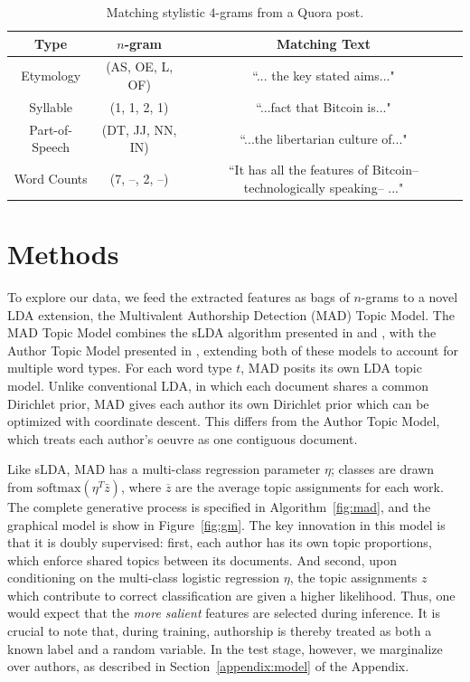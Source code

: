 \documentclass[14pt]{article} %
\theoremstyle{plain}
\theoremstyle{definition}
\theoremstyle{remark}
\begin{document}
\begin{table}[ht] 
\centering
\begin{tabular}{ c | c | c }
  Type & $n$-gram & Matching Text \\
  \hline
  Etymology & (AS, OE, L, OF) & ``... the key stated aims..." \\
  Syllable & (1, 1, 2, 1) & ``...fact that Bitcoin is..." \\
  Part-of-Speech & (DT, JJ, NN, IN) & ``...the libertarian culture of..." \\
  Word Counts & (7, --, 2, --) & ``It has all the features of Bitcoin--technologically speaking-- ..."
\end{tabular}
\caption{Matching stylistic $4$-grams from a Quora post.}
\label{tab:sample_ngrams}
\end{table}

\section{Methods}

To explore our data, we feed the extracted features as bags of $n$-grams to a novel LDA extension, the Multivalent Authorship Detection (MAD) Topic Model. The MAD Topic Model combines the sLDA algorithm presented in \cite{wang2009simultaneous} and \cite{Blei2007}, with the Author Topic Model presented in \cite{rosen2004author}, extending both of these models to account for multiple word types.  For each word type $t$, MAD posits its own LDA topic model. Unlike conventional LDA, in which each document shares a common Dirichlet prior, MAD gives each author its own Dirichlet prior which can be optimized with coordinate descent. This differs from the Author Topic Model, which treats each author's oeuvre as one contiguous document.

Like sLDA, MAD has a multi-class regression parameter $\eta$; classes are drawn from $\text{softmax}(\eta^T\bar{z})$, where $\overline{z}$ are the average topic assignments for each work. The complete generative process is specified in Algorithm~\ref{fig:mad}, and the graphical model is show in Figure~\ref{fig:gm}. The key innovation in this model is that it is doubly supervised: first, each author has its own topic proportions, which enforce shared topics between its documents. And second, upon conditioning on the multi-class logistic regression $\eta$, the topic assignments $z$ which contribute to correct classification are given a higher likelihood.  Thus, one would expect that the \emph{more salient} features are selected during inference. It is crucial to note that, during training, authorship is thereby treated as both a known label and a random variable. In the test stage, however, we marginalize over authors, as described in Section~\ref{appendix:model} of the Appendix.
\end{document}
